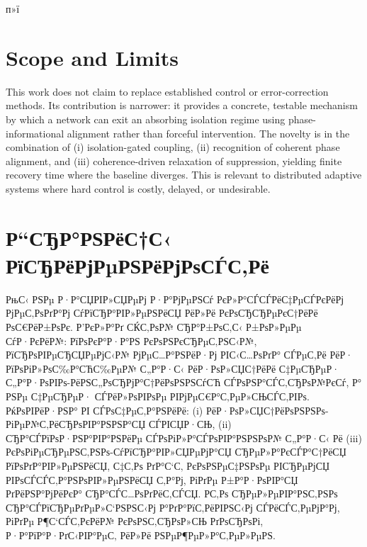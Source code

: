 ﻿п»ї\documentclass[12pt,a4paper]{article}
\begin{document}
\section{Scope and Limits}
This work does not claim to replace established control or error-correction methods. Its contribution is narrower: it provides a concrete, testable mechanism by which a network can exit an absorbing isolation regime using phase-informational alignment rather than forceful intervention. The novelty is in the combination of (i) isolation-gated coupling, (ii) recognition of coherent phase alignment, and (iii) coherence-driven relaxation of suppression, yielding finite recovery time where the baseline diverges. This is relevant to distributed adaptive systems where hard control is costly, delayed, or undesirable.

\section{Р“СЂР°РЅРёС†С‹ РїСЂРёРјРµРЅРёРјРѕСЃС‚Рё}
РњС‹ РЅРµ Р·Р°СЏРІР»СЏРµРј Р·Р°РјРµРЅСѓ РєР»Р°СЃСЃРёС‡РµСЃРєРёРј РјРµС‚РѕРґР°Рј СѓРїСЂР°РІР»РµРЅРёСЏ РёР»Рё РєРѕСЂСЂРµРєС†РёРё РѕС€РёР±РѕРє. Р’РєР»Р°Рґ СЌС‚РѕР№ СЂР°Р±РѕС‚С‹ Р±РѕР»РµРµ СѓР·РєРёР№: РїРѕРєР°Р·Р°РЅ РєРѕРЅРєСЂРµС‚РЅС‹Р№, РїСЂРѕРІРµСЂСЏРµРјС‹Р№ РјРµС…Р°РЅРёР·Рј РІС‹С…РѕРґР° СЃРµС‚Рё РёР· РїРѕРіР»РѕС‰Р°СЋС‰РµР№ С„Р°Р·С‹ РёР·РѕР»СЏС†РёРё С‡РµСЂРµР· С„Р°Р·РѕРІРѕ-РёРЅС„РѕСЂРјР°С†РёРѕРЅРЅСѓСЋ СЃРѕРЅР°СЃС‚СЂРѕР№РєСѓ, Р° РЅРµ С‡РµСЂРµР· СЃРёР»РѕРІРѕРµ РІРјРµС€Р°С‚РµР»СЊСЃС‚РІРѕ. РќРѕРІРёР·РЅР° РІ СЃРѕС‡РµС‚Р°РЅРёРё: (i) РёР·РѕР»СЏС†РёРѕРЅРЅРѕ-РіРµР№С‚РёСЂРѕРІР°РЅРЅР°СЏ СЃРІСЏР·СЊ, (ii) СЂР°СЃРїРѕР·РЅР°РІР°РЅРёРµ СЃРѕРіР»Р°СЃРѕРІР°РЅРЅРѕР№ С„Р°Р·С‹ Рё (iii) РєРѕРіРµСЂРµРЅС‚РЅРѕ-СѓРїСЂР°РІР»СЏРµРјР°СЏ СЂРµР»Р°РєСЃР°С†РёСЏ РїРѕРґР°РІР»РµРЅРёСЏ, С‡С‚Рѕ РґР°С‘С‚ РєРѕРЅРµС‡РЅРѕРµ РІСЂРµРјСЏ РІРѕСЃСЃС‚Р°РЅРѕРІР»РµРЅРёСЏ С‚Р°Рј, РіРґРµ Р±Р°Р·РѕРІР°СЏ РґРёРЅР°РјРёРєР° СЂР°СЃС…РѕРґРёС‚СЃСЏ. Р­С‚Рѕ СЂРµР»РµРІР°РЅС‚РЅРѕ СЂР°СЃРїСЂРµРґРµР»С‘РЅРЅС‹Рј Р°РґР°РїС‚РёРІРЅС‹Рј СЃРёСЃС‚РµРјР°Рј, РіРґРµ Р¶С‘СЃС‚РєРёР№ РєРѕРЅС‚СЂРѕР»СЊ РґРѕСЂРѕРі, Р·Р°РїР°Р·РґС‹РІР°РµС‚ РёР»Рё РЅРµР¶РµР»Р°С‚РµР»РµРЅ.
\end{document}
